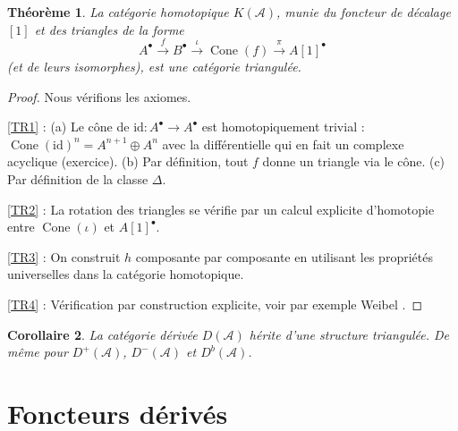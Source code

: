\documentclass[a4paper,12pt]{book}
\newcommand{\id}{\mathrm{id}}
\newtheorem{theoreme}{Théorème}[chapter]
\newtheorem{corollaire}[theoreme]{Corollaire}
\begin{document}
\begin{theoreme}\label{thm:K-triangulated}
La catégorie homotopique $K(\mathcal{A})$, munie du foncteur de décalage
$[1]$ et des triangles de la forme
\[
  A^\bullet \xrightarrow{f} B^\bullet \xrightarrow{\iota}
  \operatorname{Cone}(f) \xrightarrow{\pi} A[1]^\bullet
\]
(et de leurs isomorphes), est une catégorie triangulée.
\end{theoreme}

\begin{proof}
Nous vérifions les axiomes.

\ref{TR1} : (a) Le cône de $\id \colon A^\bullet \to A^\bullet$ est
homotopiquement trivial : $\operatorname{Cone}(\id)^n = A^{n+1} \oplus A^n$
avec la différentielle qui en fait un complexe acyclique (exercice).
(b) Par définition, tout $f$ donne un triangle via le cône.
(c) Par définition de la classe $\Delta$.

\ref{TR2} : La rotation des triangles se vérifie par un calcul explicite
d'homotopie entre $\operatorname{Cone}(\iota)$ et $A[1]^\bullet$.

\ref{TR3} : On construit $h$ composante par composante en utilisant les
propriétés universelles dans la catégorie homotopique.

\ref{TR4} : Vérification par construction explicite, voir par exemple
Weibel \cite[1.5]{weibel1994}.
\end{proof}

\begin{corollaire}\label{cor:D-triangulated}
La catégorie dérivée $D(\mathcal{A})$ hérite d'une structure triangulée.
De même pour $D^+(\mathcal{A})$, $D^-(\mathcal{A})$ et $D^b(\mathcal{A})$.
\end{corollaire}


\section{Foncteurs dérivés}\label{sec:derived-functors}
\end{document}
